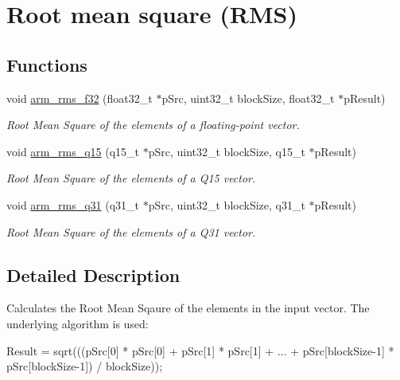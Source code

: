 \hypertarget{group___r_m_s}{\section{Root mean square (R\-M\-S)}
\label{group___r_m_s}
}
\subsection*{Functions}
\begin{DoxyCompactItemize}
\item 
void \hyperlink{group___r_m_s_ga0e3ab1b57da32d45388d1fa90d7fd88c}{arm\-\_\-rms\-\_\-f32} (float32\-\_\-t $\ast$p\-Src, uint32\-\_\-t block\-Size, float32\-\_\-t $\ast$p\-Result)
\begin{DoxyCompactList}\small\item\em Root Mean Square of the elements of a floating-\/point vector. \end{DoxyCompactList}\item 
void \hyperlink{group___r_m_s_gaf5b836b72dda9e5dfbbd17c7906fd13f}{arm\-\_\-rms\-\_\-q15} (q15\-\_\-t $\ast$p\-Src, uint32\-\_\-t block\-Size, q15\-\_\-t $\ast$p\-Result)
\begin{DoxyCompactList}\small\item\em Root Mean Square of the elements of a Q15 vector. \end{DoxyCompactList}\item 
void \hyperlink{group___r_m_s_gae33015fda23fc44e7ead5e5ed7e8d314}{arm\-\_\-rms\-\_\-q31} (q31\-\_\-t $\ast$p\-Src, uint32\-\_\-t block\-Size, q31\-\_\-t $\ast$p\-Result)
\begin{DoxyCompactList}\small\item\em Root Mean Square of the elements of a Q31 vector. \end{DoxyCompactList}\end{DoxyCompactItemize}


\subsection{Detailed Description}
Calculates the Root Mean Sqaure of the elements in the input vector. The underlying algorithm is used\-:


\begin{DoxyPre}   
    Result = sqrt(((pSrc[0] * pSrc[0] + pSrc[1] * pSrc[1] + ... + pSrc[blockSize-1] * pSrc[blockSize-1]) / blockSize));   
\end{DoxyPre}


